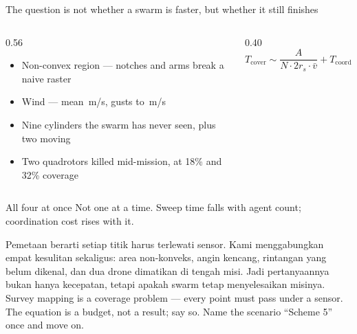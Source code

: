 \documentclass[aspectratio=169,11pt,t]{beamer}
\renewcommand{\sectioncount}{9}
\begin{document}
\kick{Problem}{1 / \sectioncount}

\begin{frame}{The question is not whether a swarm is faster, but whether it still finishes}
  \begin{columns}[T,onlytextwidth]
    \begin{column}{0.56\textwidth}
      \begin{itemize}\bulletgap\small
        \item Non-convex region --- notches and arms break a naive raster
        \item Wind --- mean \WindMeanMag\,m/s, gusts to \WindMaxH\,m/s
        \item Nine cylinders the swarm has never seen, plus two moving
        \item Two quadrotors killed mid-mission, at 18\% and 32\% coverage
      \end{itemize}
    \end{column}
    \begin{column}{0.40\textwidth}
      \vskip2mm\small
      \[ T_{\mathrm{cover}}\sim\frac{A}{N\cdot 2r_s\cdot\bar v}+T_{\mathrm{coord}}(N) \]
    \end{column}
  \end{columns}
  \vfill
  \begin{callout}{All four at once}
    Not one at a time. Sweep time falls with agent count; coordination cost
    rises with it.
  \end{callout}
    {Pemetaan berarti setiap titik harus terlewati sensor. Kami menggabungkan empat kesulitan sekaligus: area non-konveks, angin kencang, rintangan yang belum dikenal, dan dua drone dimatikan di tengah misi. Jadi pertanyaannya bukan hanya kecepatan, tetapi apakah swarm tetap menyelesaikan misinya.}
    {Survey mapping is a coverage problem --- every point must pass
        under a sensor. The equation is a budget, not a result; say so. Name the
        scenario ``Scheme 5'' once and move on.}
\end{frame}
\end{document}
